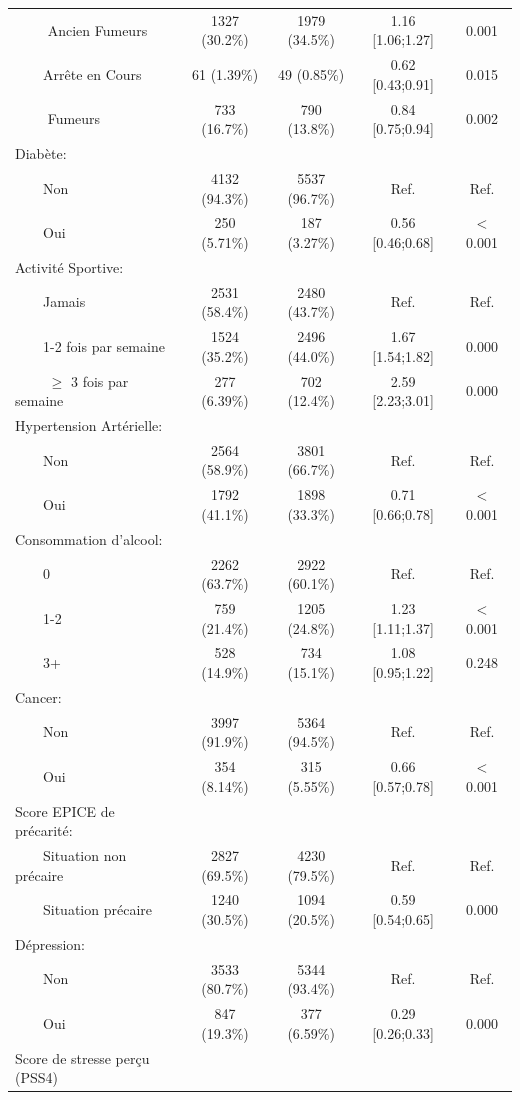\documentclass{book}
\begin{document}
\begin{longtable}{lcccc}
$\qquad$ Ancien Fumeurs & 1327 (30.2\%) & 1979 (34.5\%) & 1.16 [1.06;1.27] &  0.001 \\ 
$\qquad$Arrête en Cours &  61 (1.39\%)  &  49 (0.85\%)  & 0.62 [0.43;0.91] &  0.015 \\ 
$\qquad$ Fumeurs & 733 (16.7\%)  & 790 (13.8\%)  & 0.84 [0.75;0.94] &  0.002 \\ 
Diabète: &              &              &                  &        \\ 
$\qquad$Non & 4132 (94.3\%) & 5537 (96.7\%) &       Ref.       &  Ref.  \\ 
$\qquad$Oui & 250 (5.71\%)  & 187 (3.27\%)  & 0.56 [0.46;0.68] & $<$0.001 \\ 
Activité Sportive: &              &              &                  &        \\ 
$\qquad$Jamais & 2531 (58.4\%) & 2480 (43.7\%) &       Ref.       &  Ref.  \\ 
$\qquad$1-2 fois par semaine & 1524 (35.2\%) & 2496 (44.0\%) & 1.67 [1.54;1.82] &  0.000 \\ 
$\qquad$ $\geq$ 3 fois par semaine & 277 (6.39\%)  & 702 (12.4\%)  & 2.59 [2.23;3.01] &  0.000 \\ 
Hypertension Artérielle: &              &              &                  &        \\ 
$\qquad$Non & 2564 (58.9\%) & 3801 (66.7\%) &       Ref.       &  Ref.  \\ 
$\qquad$Oui & 1792 (41.1\%) & 1898 (33.3\%) & 0.71 [0.66;0.78] & $<$0.001 \\ 
Consommation d'alcool: &              &              &                  &        \\ 
$\qquad$0 & 2262 (63.7\%) & 2922 (60.1\%) &       Ref.       &  Ref.  \\ 
$\qquad$1-2 & 759 (21.4\%)  & 1205 (24.8\%) & 1.23 [1.11;1.37] & $<$0.001 \\ 
$\qquad$3+ & 528 (14.9\%)  & 734 (15.1\%)  & 1.08 [0.95;1.22] &  0.248 \\ 
Cancer: &              &              &                  &        \\ 
$\qquad$Non & 3997 (91.9\%) & 5364 (94.5\%) &       Ref.       &  Ref.  \\ 
$\qquad$Oui & 354 (8.14\%)  & 315 (5.55\%)  & 0.66 [0.57;0.78] & $<$0.001 \\ 
Score EPICE de précarité: &              &              &                  &        \\ 
$\qquad$Situation non précaire & 2827 (69.5\%) & 4230 (79.5\%) &       Ref.       &  Ref.  \\ 
$\qquad$Situation précaire & 1240 (30.5\%) & 1094 (20.5\%) & 0.59 [0.54;0.65] &  0.000 \\ 
Dépression: &              &              &                  &        \\ 
$\qquad$Non & 3533 (80.7\%) & 5344 (93.4\%) &       Ref.       &  Ref.  \\ 
$\qquad$Oui & 847 (19.3\%)  & 377 (6.59\%)  & 0.29 [0.26;0.33] &  0.000 \\ 
Score de stresse perçu (PSS4)


\end{longtable}
\end{document}

